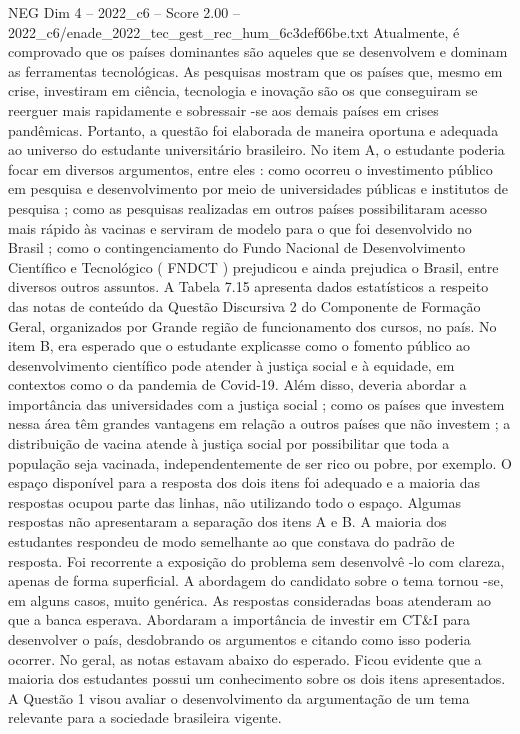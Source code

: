 \begin{textsample}{NEG Dim 4 – 2022\_c6 – Score 2.00 – 2022\_c6/enade\_2022\_tec\_gest\_rec\_hum\_6c3def66be.txt}
Atualmente, é comprovado que os países dominantes são aqueles que se desenvolvem e dominam as ferramentas tecnológicas.
As pesquisas mostram que os países que, mesmo em crise, investiram em ciência, tecnologia e inovação são os que conseguiram se reerguer mais rapidamente e sobressair -se aos demais países em crises pandêmicas.
Portanto, a questão foi elaborada de maneira oportuna e adequada ao universo do estudante universitário brasileiro.
No item A, o estudante poderia focar em diversos argumentos, entre eles : como ocorreu o investimento público em pesquisa e desenvolvimento por meio de universidades públicas e institutos de pesquisa ; como as pesquisas realizadas em outros países possibilitaram acesso mais rápido às vacinas e serviram de modelo para o que foi desenvolvido no Brasil ; como o contingenciamento do Fundo Nacional de Desenvolvimento Científico e Tecnológico ( FNDCT ) prejudicou e ainda prejudica o Brasil, entre diversos outros assuntos.
A Tabela 7.15 apresenta dados estatísticos a respeito das notas de conteúdo da Questão Discursiva 2 do Componente de Formação Geral, organizados por Grande região de funcionamento dos cursos, no país.
No item B, era esperado que o estudante explicasse como o fomento público ao desenvolvimento científico pode atender à justiça social e à equidade, em contextos como o da pandemia de Covid-19.
Além disso, deveria abordar a importância das universidades com a justiça social ; como os países que investem nessa área têm grandes vantagens em relação a outros países que não investem ; a distribuição de vacina atende à justiça social por possibilitar que toda a população seja vacinada, independentemente de ser rico ou pobre, por exemplo.
O espaço disponível para a resposta dos dois itens foi adequado e a maioria das respostas ocupou parte das linhas, não utilizando todo o espaço.
Algumas respostas não apresentaram a separação dos itens A e B.
A maioria dos estudantes respondeu de modo semelhante ao que constava do padrão de resposta.
Foi recorrente a exposição do problema sem desenvolvê -lo com clareza, apenas de forma superficial.
A abordagem do candidato sobre o tema tornou -se, em alguns casos, muito genérica.
As respostas consideradas boas atenderam ao que a banca esperava.
Abordaram a importância de investir em CT\&I para desenvolver o país, desdobrando os argumentos e citando como isso poderia ocorrer.
No geral, as notas estavam abaixo do esperado.
Ficou evidente que a maioria dos estudantes possui um conhecimento sobre os dois itens apresentados.
A Questão 1 visou avaliar o desenvolvimento da argumentação de um tema relevante para a sociedade brasileira vigente.

\end{textsample}
